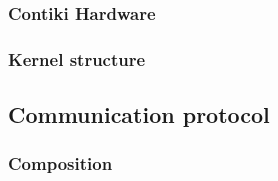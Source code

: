 

\subsubsection{Contiki Hardware}

\subsubsection{Kernel structure}


\subsection{Communication protocol}


\subsubsection{Composition}

